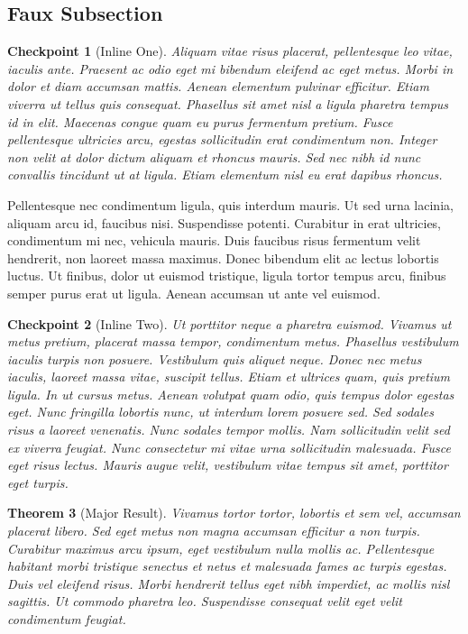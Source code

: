 \documentclass[pdflatex]{sn-jnl}
\theoremstyle{thmstyleone}%
\newtheorem{theorem}{Theorem}[section]
\theoremstyle{thmstyletwo}%
\newtheorem{inlineexercise}[theorem]{Checkpoint}
\theoremstyle{thmstylethree}%
\numberwithin{equation}{section}
\begin{document}
\subsection{Faux Subsection}\label{section-exercises-multiple-3}%
\begin{inlineexercise}[Inline One]\label{section-exercises-multiple-3-2}%
%
Aliquam vitae risus placerat, pellentesque leo vitae, iaculis ante. Praesent ac odio eget mi bibendum eleifend ac eget metus. Morbi in dolor et diam accumsan mattis. Aenean elementum pulvinar efficitur. Etiam viverra ut tellus quis consequat. Phasellus sit amet nisl a ligula pharetra tempus id in elit. Maecenas congue quam eu purus fermentum pretium. Fusce pellentesque ultricies arcu, egestas sollicitudin erat condimentum non. Integer non velit at dolor dictum aliquam et rhoncus mauris. Sed nec nibh id nunc convallis tincidunt ut at ligula. Etiam elementum nisl eu erat dapibus rhoncus.%
\end{inlineexercise}%
Pellentesque nec condimentum ligula, quis interdum mauris. Ut sed urna lacinia, aliquam arcu id, faucibus nisi. Suspendisse potenti. Curabitur in erat ultricies, condimentum mi nec, vehicula mauris. Duis faucibus risus fermentum velit hendrerit, non laoreet massa maximus. Donec bibendum elit ac lectus lobortis luctus. Ut finibus, dolor ut euismod tristique, ligula tortor tempus arcu, finibus semper purus erat ut ligula. Aenean accumsan ut ante vel euismod.%
\begin{inlineexercise}[Inline Two]\label{section-exercises-multiple-3-4}%
%
Ut porttitor neque a pharetra euismod. Vivamus ut metus pretium, placerat massa tempor, condimentum metus. Phasellus vestibulum iaculis turpis non posuere. Vestibulum quis aliquet neque. Donec nec metus iaculis, laoreet massa vitae, suscipit tellus. Etiam et ultrices quam, quis pretium ligula. In ut cursus metus. Aenean volutpat quam odio, quis tempus dolor egestas eget. Nunc fringilla lobortis nunc, ut interdum lorem posuere sed. Sed sodales risus a laoreet venenatis. Nunc sodales tempor mollis. Nam sollicitudin velit sed ex viverra feugiat. Nunc consectetur mi vitae urna sollicitudin malesuada. Fusce eget risus lectus. Mauris augue velit, vestibulum vitae tempus sit amet, porttitor eget turpis.%
\end{inlineexercise}%
\begin{theorem}[Major Result]\label{section-exercises-multiple-3-5}%
%
Vivamus tortor tortor, lobortis et sem vel, accumsan placerat libero. Sed eget metus non magna accumsan efficitur a non turpis. Curabitur maximus arcu ipsum, eget vestibulum nulla mollis ac. Pellentesque habitant morbi tristique senectus et netus et malesuada fames ac turpis egestas. Duis vel eleifend risus. Morbi hendrerit tellus eget nibh imperdiet, ac mollis nisl sagittis. Ut commodo pharetra leo. Suspendisse consequat velit eget velit condimentum feugiat.%
\end{theorem}
\end{document}
